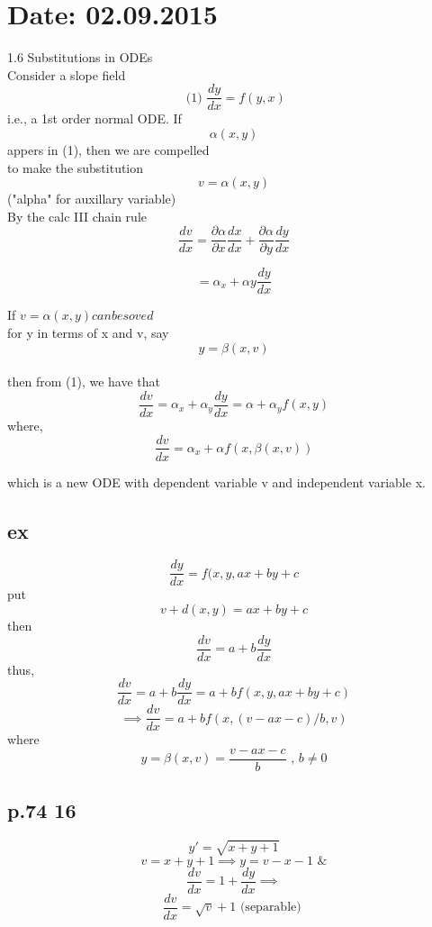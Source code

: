 \documentclass[10pt,a4paper]{article}
\begin{document}


 \newpage 
{}
\section{Date: 02.09.2015}
  1.6 Substitutions in ODEs \\
  Consider a slope field  \\
  \[ \text{ (1) } \frac{dy}{dx} = f(y, x)\]
  i.e., a 1st order normal ODE. If
  \[ \alpha (x, y)\]
  appers in (1), then we are compelled  \\
  to make the substitution  \\
  \[ v = \alpha (x, y)\]
  ("alpha" for auxillary variable) \\
  By the calc III chain rule\nonumber\\
  \[ \frac{dv}{dx} = \frac{\partial\alpha}{\partial x} \frac{dx}{dx} + \frac{\partial
  \alpha}{\partial y} \frac{dy}{dx}\]
  
  \[ = \alpha_x + \alpha y \frac{dy}{dx}\]
  
  If \( v = \alpha (x, y) can be soved \) \\
  for y in terms of x and v, say  \\
  \[ y = \beta(x, v) \] \\
  then from (1), we have that  \\
  \[ \frac{dv}{dx} = \alpha_x + \alpha_y \frac{dy}{dx} = \alpha +
  \alpha_y f(x, y) \]
  where, 
  \[ \boxed{ \frac{dv}{dx} = \alpha_x + \alpha f(x, \beta(x, v))}\]

  which is a new ODE with dependent variable v
  and independent variable x. 
  \subsection{ex}
  \[ \frac{dy}{dx} = f(x, y , ax+by+c\]
  put 
  \[ v + d(x, y) = ax + by + c\]
  then 
  \[ \frac{dv}{dx} = a + b \frac{dy}{dx}\]
  thus, 
  \[ \frac{dv}{dx} = a + b \frac{dy}{dx} = a + b f(x, y, ax + by +c)\]
  \[ \implies \boxed{\frac{dv}{dx} = a + b f(x, (v-ax-c)/b, v)}\]
  where 
  \[ y = \beta (x, v) = \frac{v-ax-c}{b} \text{ , } b \neq 0\]

  \subsection{p.74 16}
  \[ y' = \sqrt{x+y+1}\]
  \[ v = x + y + 1 \implies y = v - x - 1 \text{ \& } \]
  \[ \frac{dv}{dx} = 1 + \frac{dy}{dx} \implies \]
  \[ \frac{dv}{dx} = \sqrt{v} + 1 \text{ (separable) }\]
\end{document}

